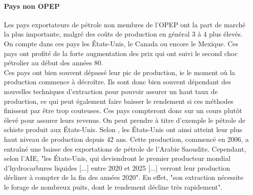 \paragraph{Pays non OPEP} 
Les pays exportateurs de pétrole non membres de l’OPEP ont la part de marché la plus importante, malgré des coûts de production en général 3 à 4 plus élevés. On compte dans ces pays les États-Unis, le Canada ou encore le Mexique. Ces pays ont profité de la forte augmentation des prix qui ont suivi le second choc pétrolier au début des années 80.\\
Ces pays ont bien souvent dépassé leur pic de production, ie le moment où la production commence à décroître. Ils sont donc bien souvent dépendant des nouvelles techniques d’extraction pour pouvoir assurer un haut taux de production, ce qui peut également faire baisser le rendement si ces méthodes finissent par être trop couteuses. Ces pays compteront donc sur un cours plutôt élevé pour assurer leurs revenus. On peut prendre à titre d’exemple le pétrole de schiste produit aux États-Unis.
Selon \cite{mndOpepPression}, les États-Unis ont ainsi atteint leur plus haut niveau de production depuis 42 ans. Cette production, commencé en 2006, a entraîné une baisse des exportations de pétrole de l’Arabie Saoudite. Cependant, selon l’AIE, "les États-Unis, qui deviendront le premier producteur mondial d’hydrocarbures liquides [...] entre 2020 et 2025 [...] verront leur production décliner à compter de la fin des années 2020". En effet, "son extraction nécessite le forage de nombreux puits, dont le rendement décline très rapidement". \cite{wikiSchiste}

